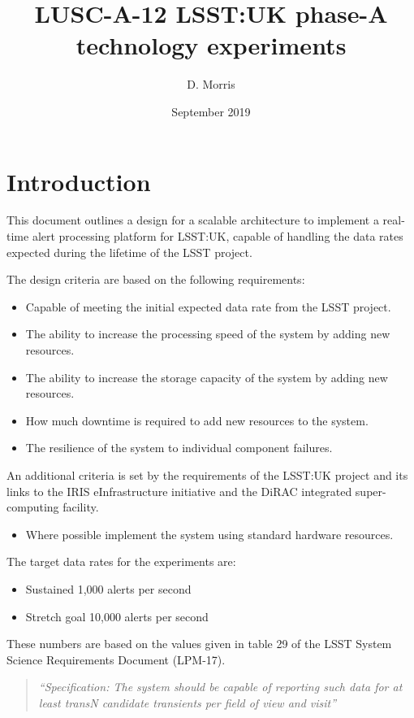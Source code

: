 \documentclass{article}
\title{LUSC-A-12 LSST:UK phase-A technology experiments}
\author{D. Morris}
\date{September 2019}
\newcommand{\lsst} {LSST\xspace}
\newcommand{\lsstuk} {LSST:UK\xspace}
\newcommand{\iris} {IRIS\xspace}
\begin{document}
\maketitle

\tableofcontents

\section{Introduction}
\label{introduction}
This document outlines a design for a scalable architecture to implement a real-time alert
processing platform for \lsstuk, capable of handling the data rates expected during the
lifetime of the \lsst project.

The design criteria are based on the following requirements:
\begin{itemize}
  \item Capable of meeting the initial expected data rate from the \lsst project.
  \item The ability to increase the processing speed of the system by adding new resources.
  \item The ability to increase the storage capacity of the system by adding new resources.
  \item How much downtime is required to add new resources to the system.
  \item The resilience of the system to individual component failures.
\end{itemize}

An additional criteria is set by the requirements of the \lsstuk project and its
links to the \iris eInfrastructure initiative and the DiRAC integrated super-computing facility.
\begin{itemize}
  \item Where possible implement the system using standard hardware resources.
\end{itemize}

The target data rates for the experiments are:
\begin{itemize}
  \item Sustained 1,000 alerts per second
  \item Stretch goal 10,000 alerts per second
\end{itemize}

These numbers are based on the values given in table 29 of the \lsst System Science Requirements Document (LPM-17).

\begin{quote}
\textit{“Specification: The system should be capable of reporting such data for at least transN candidate transients per field of view and visit”}
\end{quote}
\end{document}

